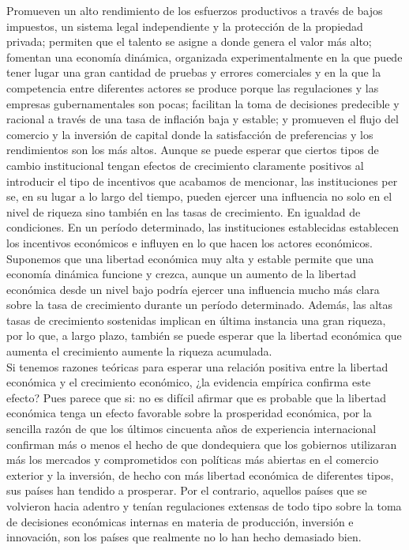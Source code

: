     Promueven un alto rendimiento de los esfuerzos productivos a través de bajos impuestos, un sistema legal independiente y la protección de la propiedad privada; permiten que el talento se asigne a donde genera el valor más alto; fomentan una economía dinámica, organizada experimentalmente en la que puede tener lugar una gran cantidad de pruebas y errores comerciales y en la que la competencia entre diferentes actores se produce porque las regulaciones y las empresas gubernamentales son pocas; facilitan la toma de decisiones predecible y racional a través de una tasa de inflación baja y estable; y promueven el flujo del comercio y la inversión de capital donde la satisfacción de preferencias y los rendimientos son los más altos. Aunque se puede esperar que ciertos tipos de cambio institucional tengan efectos de crecimiento claramente positivos al introducir el tipo de incentivos que acabamos de mencionar, las instituciones per se, en su lugar a lo largo del tiempo, pueden ejercer una influencia no solo en el nivel de riqueza sino también en las tasas de crecimiento. En igualdad de condiciones. En un período determinado, las instituciones establecidas establecen los incentivos económicos e influyen en lo que hacen los actores económicos. Suponemos que una libertad económica muy alta y estable permite que una economía dinámica funcione y crezca, aunque un aumento de la libertad económica desde un nivel bajo podría ejercer una influencia mucho más clara sobre la tasa de crecimiento durante un período determinado. Además, las altas tasas de crecimiento sostenidas implican en última instancia una gran riqueza, por lo que, a largo plazo, también se puede esperar que la libertad económica que aumenta el crecimiento aumente la riqueza acumulada. \\
    Si tenemos razones teóricas para esperar una relación positiva entre la libertad económica y el crecimiento económico, ¿la evidencia empírica confirma este efecto? Pues parece que si: no es difícil afirmar que es probable que la libertad económica tenga un efecto favorable sobre la prosperidad económica, por la sencilla razón de que los últimos cincuenta años de experiencia internacional confirman más o menos el hecho de que dondequiera que los gobiernos utilizaran más los mercados y comprometidos con políticas más abiertas en el comercio exterior y la inversión, de hecho con más libertad económica de diferentes tipos, sus países han tendido a prosperar. Por el contrario, aquellos países que se volvieron hacia adentro y tenían regulaciones extensas de todo tipo sobre la toma de decisiones económicas internas en materia de producción, inversión e innovación, son los países que realmente no lo han hecho demasiado bien.\\
